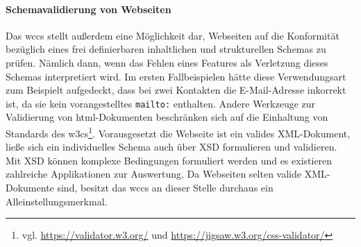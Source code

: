         \paragraph{Schemavalidierung von Webseiten}
        Das \gls{wccs} stellt außerdem eine Möglichkeit dar,
        Webseiten auf die Konformität bezüglich eines frei definierbaren
        inhaltlichen und strukturellen Schemas zu prüfen.
        Nämlich dann, wenn das Fehlen eines Features als Verletzung
        dieses Schemas interpretiert wird.
        Im ersten Fallbeispielen hätte diese Verwendungsart zum Beispielt aufgedeckt,
        dass bei zwei Kontakten die E-Mail-Adresse inkorrekt ist,
        da sie kein vorangestelltes \texttt{mailto:} enthalten.
        Andere Werkzeuge zur Validierung von \gls{html}-Dokumenten
        beschränken sich auf die Einhaltung von Standards des
        \glspl{w3c}\footnote{vgl. \url{https://validator.w3.org/} und \url{https://jigsaw.w3.org/css-validator/}}.
        Vorausgesetzt die Webseite ist ein valides XML-Dokument,
        ließe sich ein individuelles Schema auch über XSD formulieren und validieren.
        Mit XSD können komplexe Bedingungen formuliert werden und es existieren
        zahlreiche Applikationen zur Auswertung.
        Da Webseiten selten valide XML-Dokumente sind,
        besitzt das \gls{wccs} an dieser Stelle durchaus
        ein Alleinstellungsmerkmal.
